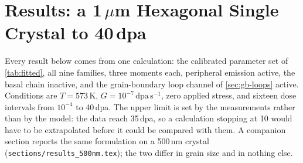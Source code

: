 \section{Results: a 1\,\texorpdfstring{$\mu$}{u}m Hexagonal Single Crystal to 40\,dpa}
\label{sec:results}

Every result below comes from one calculation: the calibrated parameter set of
\cref{tab:fitted}, all nine families, three moments each, peripheral emission
active, the basal chain inactive, and the grain-boundary loop channel of
\cref{sec:gb-loops} active. Conditions are $T=573\,$K,
$G=10^{-7}\,\mathrm{dpa\,s^{-1}}$, zero applied stress, and sixteen dose
intervals from $10^{-4}$ to 40\,dpa. The upper limit is set by the measurements
rather than by the model: the \cloop{} data reach 35\,dpa, so a calculation
stopping at 10 would have to be extrapolated before it could be compared with
them. A companion section reports the same formulation on a 500\,nm crystal
(\texttt{sections/results\_500nm.tex}); the two differ in grain size and in
nothing else.



